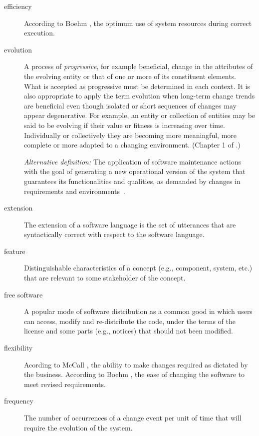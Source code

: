 \documentclass[11pt, oneside]{article}
\begin{document}
\begin{description}
\item[efficiency]
According to Boehm \cite{opac-b1104886}, the optimum use of system resources during correct execution.

\item[evolution]
A process of \emph{progressive}, for example beneficial, change in the attributes of the evolving entity or that of one or more of its constituent elements. What is accepted as progressive must be determined in each context.
It is also appropriate to apply the term evolution when long-term change trends are beneficial even though isolated or short sequences of changes may appear degenerative. For example, an entity or collection of entities may be said to be evolving if their value or fitness is increasing over time. Individually or collectively they are becoming more meaningful, more complete or more adapted to a changing environment. (Chapter 1 of \cite{MadhavjiEtAl2006}.)

\noindent \emph{Alternative definition:} The application of software maintenance actions with the goal of generating a new operational version of the system that guarantees its functionalities and qualities, as demanded by changes in requirements and environments~\cite{Chapin:2001:typesofSE,MensEtal2005IWPSE}.

\item[extension]
The extension of a software language is the set of utterances that are syntactically correct with respect to the software language.



\item[feature]
Distinguishable characteristics of a concept (e.g., component, system, etc.) that are relevant to some stakeholder of the concept\cite{czarnecki:gp}.

\item[free software]
A popular mode of software distribution as a common good in which users can access, modify and re-distribute the code, under the terms of the license and some parts (e.g., notices) that should not been modified.

\item[flexibility]
Acording to McCall \cite{mccall1977factors}, the ability to make changes required as dictated by the business.
According to Boehm \cite{opac-b1104886}, the ease of changing the software to meet revised requirements.

\item[frequency]
The number of occurrences of a change event per unit of time that will require the evolution of the system.


\end{description}
\end{document}
